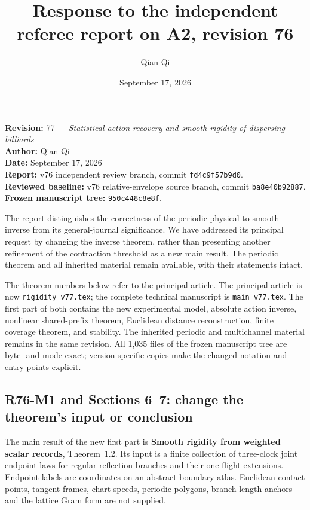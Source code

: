 \documentclass[
  11pt,
]{article}
\title{Response to the independent referee report on A2, revision 76}
\author{Qian Qi}
\date{September 17, 2026}
\begin{document}
\maketitle

\textbf{Revision:} 77 --- \emph{Statistical action recovery and smooth
rigidity of dispersing billiards}\\
\textbf{Author:} Qian Qi\\
\textbf{Date:} September 17, 2026\\
\textbf{Report:} v76 independent review branch, commit
\texttt{fd4c9f57b9d0}.\\
\textbf{Reviewed baseline:} v76 relative-envelope source branch, commit
\texttt{ba8e40b92887}.\\
\textbf{Frozen manuscript tree:} \texttt{950c448c8e8f}.

The report distinguishes the correctness of the periodic
physical-to-smooth inverse from its general-journal significance. We
have addressed its principal request by changing the inverse theorem,
rather than presenting another refinement of the contraction threshold
as a new main result. The periodic theorem and all inherited material
remain available, with their statements intact.

The theorem numbers below refer to the principal article.
The principal article is now \texttt{rigidity\_v77.tex}; the complete
technical manuscript is \texttt{main\_v77.tex}. The first part of both
contains the new experimental model, absolute action inverse, nonlinear
shared-prefix theorem, Euclidean distance reconstruction, finite
coverage theorem, and stability. The inherited periodic and multichannel
material remains in the same revision. All 1,035 files of the frozen
manuscript tree are byte- and mode-exact; version-specific copies make
the changed notation and entry points explicit.

\subsection{R76-M1 and Sections 6--7: change the theorem's input or
conclusion}\label{r76-m1-and-sections-67-change-the-theorems-input-or-conclusion}

The main result of the new first part is \textbf{Smooth rigidity from
weighted scalar records}, Theorem~1.2. Its input is a finite
collection of three-clock joint endpoint laws for regular reflection
branches and their one-flight extensions. Endpoint labels are
coordinates on an abstract boundary atlas. Euclidean contact points,
tangent frames, chart speeds, periodic polygons, branch length anchors
and the lattice Gram form are not supplied.
\end{document}

